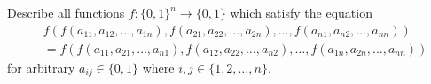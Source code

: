 Describe all functions $f: \{ 0,1\}^n \to \{ 0,1\}$ which satisfy the equation
\begin{align*}
& f(f(a_{11},a_{12},\dotsc ,a_{1n}),f(a_{21},a_{22},\dotsc ,a_{2n}),\dotsc ,f(a_{n1},a_{n2},\dotsc ,a_{nn}))\\
&  = f(f(a_{11},a_{21},\dotsc ,a_{n1}),f(a_{12},a_{22},\dotsc ,a_{n2}),\dotsc ,f(a_{1n},a_{2n},\dotsc ,a_{nn}))\end{align*}for arbitrary $a_{ij}\in \{ 0,1\}$ where $i,j\in \{1,2,\dotsc ,n\}.$